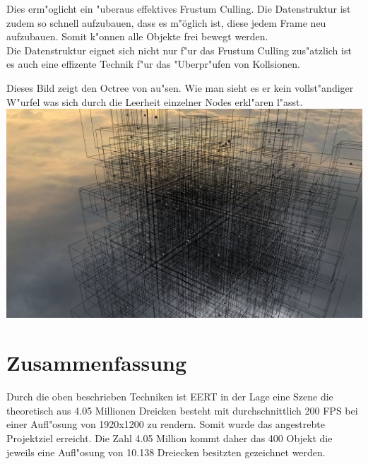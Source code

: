 \documentclass[a4paper,titlepage]{article}
\begin{document}
Dies erm"oglicht ein "uberaus effektives Frustum Culling. Die Datenstruktur ist zudem so schnell aufzubauen, 
dass es m"öglich ist, diese jedem Frame neu aufzubauen. Somit k"onnen alle Objekte frei bewegt werden.\\

Die Datenstruktur eignet sich nicht nur f"ur das Frustum Culling zus"atzlich ist es auch eine effizente Technik
f"ur das "Uberpr"ufen von Kollsionen.

Dieses Bild zeigt den Octree von au"sen. Wie man sieht es er kein vollst"andiger W"urfel was sich durch die 
Leerheit einzelner Nodes erkl"aren l"asst.\\
\includegraphics[width = 1.0\textwidth]{oc2.png}

\section{Zusammenfassung}
Durch die oben beschrieben Techniken ist EERT in der Lage eine Szene die theoretisch aus 4.05 Millionen Dreicken
besteht mit durchschnittlich 200 FPS bei einer Aufl"osung von 1920x1200 zu rendern. Somit wurde das angestrebte
Projektziel erreicht. Die Zahl 4.05 Million kommt daher das 400 Objekt die jeweils eine Aufl"osung von 10.138 Dreiecken
besitzten gezeichnet werden.
\end{document}
